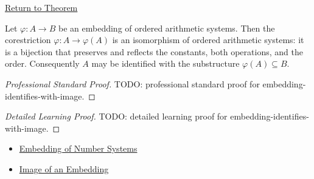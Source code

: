 \newpage
{}
\label{prf:embedding-identifies-with-image}

\begin{remark*}[Return]
\hyperref[thm:embedding-identifies-with-image]{Return to Theorem}
\end{remark*}

\begin{theorem*}
Let $\varphi:A\to B$ be an embedding of ordered arithmetic systems. Then the corestriction $\varphi:A\to\varphi(A)$ is an isomorphism of ordered arithmetic systems: it is a bijection that preserves and reflects the constants, both operations, and the order. Consequently $A$ may be identified with the substructure $\varphi(A)\subseteq B$.
\end{theorem*}

\begin{proof}[Professional Standard Proof]
\LRAProofBodyStart
TODO: professional standard proof for embedding-identifies-with-image.
\end{proof}

\begin{proof}[Detailed Learning Proof]
\LRAProofBodyStart
TODO: detailed learning proof for embedding-identifies-with-image.
\end{proof}

\begin{remark*}
\end{remark*}

\begin{dependencies}
\begin{itemize}
  \item \hyperref[def:number-system-embedding]{Embedding of Number Systems}
  \item \hyperref[def:image-of-embedding]{Image of an Embedding}
\end{itemize}
\end{dependencies}

\clearpage
